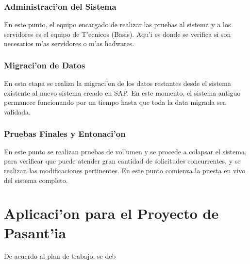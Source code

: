 \subsubsection{Administraci'on del Sistema}
	En este punto, el equipo encargado de realizar las pruebas al sistema y a los servidores es el equipo de T'ecnicos (Basis). Aqu'i es donde se verifica si son necesarios m'as servidores o m'as hadwares.
	
\subsubsection{Migraci'on de Datos}
	En esta etapa se realiza la migraci'on de los datos restantes desde el sistema existente al nuevo sistema creado en SAP. En este momento, el sistema antiguo permanece funcionando por un tiempo hasta que toda la data migrada sea validada. 
	
\subsubsection{Pruebas Finales y Entonaci'on}
	En este punto se realizan pruebas de vol'umen y se procede  a colapsar el sistema, para verificar que puede atender gran cantidad de solicitudes concurrentes, y se realizan las modificaciones pertinentes. En este punto comienza la puesta en vivo del sistema completo.

\section{Aplicaci'on para el Proyecto de Pasant'ia}
	De acuerdo al plan de trabajo, se deb